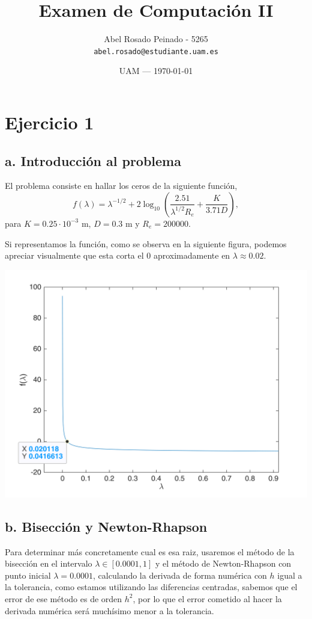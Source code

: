 \documentclass{article}
\title{Examen de Computación II} %
\author{Abel Rosado Peinado - 5265\\ \texttt{abel.rosado@estudiante.uam.es}} %
\date{UAM --- \today} %
\begin{document}
\maketitle %

\section*{Ejercicio 1}
\subsection*{a. Introducción al problema}
El problema consiste en hallar los ceros de la siguiente función, 
\[f(\lambda) = \lambda^{-1/2}+2 \log_{10}{\left(\frac{2.51}{\lambda^{1/2} R_e}+ \frac{K}{3.71D}\right)},\]
para $K=0.25\cdot10^{-3}$ m, $D = 0.3$ m y $R_e = 200000$.

Si representamos la función, como se observa en la siguiente figura, podemos apreciar visualmente que esta corta el 0 aproximadamente en $\lambda \approx 0.02$.

\includegraphics{untitled1.png}

\subsection*{b. Bisección y Newton-Rhapson}
Para determinar más concretamente cual es esa raiz, usaremos el método de la bisección en el intervalo $\lambda \in [0.0001,1]$ y el método de Newton-Rhapson con punto inicial $\lambda = 0.0001$, calculando la derivada de forma numérica con $h$ igual a la tolerancia, como estamos utilizando las diferencias centradas, sabemos que el error de ese método es de orden $h^2$, por lo que el error cometido al hacer la derivada numérica será muchísimo menor a la tolerancia.
\end{document}
